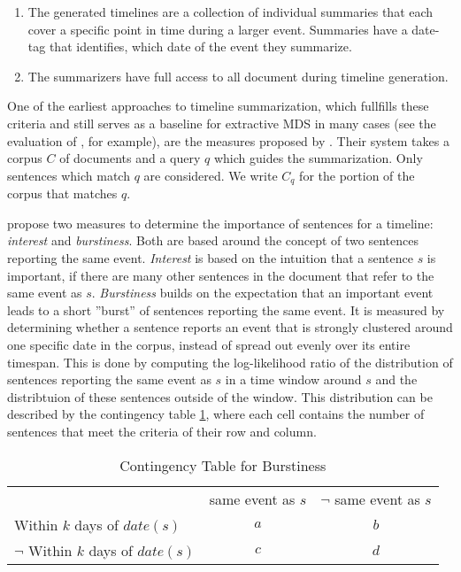\documentclass[a4paper,BCOR=10mm]{report}
\numberwithin{lemma}{chapter}
\numberwithin{definition}{chapter}
\begin{document}
\begin{enumerate}
    \item{The generated timelines are a collection of individual summaries that each cover a specific point in time during a larger event. Summaries have a date-tag that identifies, which date of the event they summarize.}
    \item{The summarizers have full access to all document during timeline generation.}
\end{enumerate}


One of the earliest approaches to timeline summarization, which fullfills these criteria and still serves as a baseline for extractive MDS in many cases (see the evaluation of \citet{markert}, for example), are the measures proposed by \citet{chieu}.
Their system takes a corpus $C$ of documents and a query $q$ which guides the summarization. Only sentences which match $q$ are considered. We write $C_q$ for the portion of the corpus that matches $q$.

\citeauthor{chieu} propose two measures to determine the importance of sentences for a timeline: \textit{interest} and \textit{burstiness}.
Both are based around the concept of two sentences reporting the same event. \textit{Interest} is based on the intuition that a sentence $s$ is important, if there are many other sentences in the document that refer to the same event as $s$. \textit{Burstiness} builds on the expectation that an important event leads to a short ''burst'' of sentences reporting the same event.
It is measured by determining whether a sentence reports an event that is strongly clustered around one specific date in the corpus, instead of spread out evenly over its entire timespan. This is done by computing the log-likelihood ratio of the distribution of sentences reporting the same event as $s$ in a time window around $s$ and the distribtuion of these sentences outside of the window.
This distribution can be described by the contingency table \ref{tab:chieu}, where each cell contains the number of sentences that meet the criteria of their row and column.

\begin{table}
\begin{tabular}{|l|c|c|}
& same event as $s$ & $\lnot$ same event as $s$ \\
Within $k$ days of $\mathit{date}(s)$ & $a$ & $b$ \\
$\lnot$ Within $k$ days of $\mathit{date}(s)$ & $c$ & $d$
\end{tabular}
\caption{Contingency Table for Burstiness}
\label{tab:chieu}
\end{table}
\end{document}
